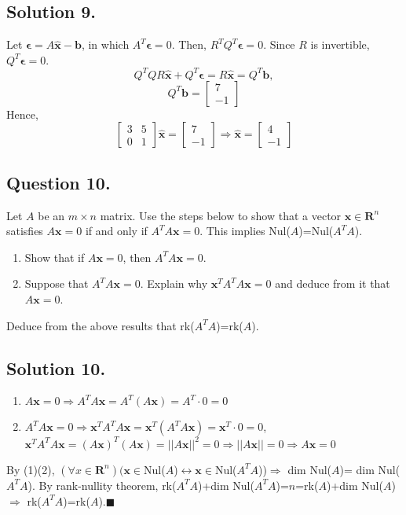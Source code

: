 \documentclass{article}
\begin{document}
\subsection*{Solution 9.}
Let $\mathbf{\epsilon}=A\mathbf{\hat{x}}-\mathbf{b}$,  in which $A^T\mathbf{\epsilon}=0$.\newline
Then, $R^TQ^T\mathbf{\epsilon}=0$. Since $R$ is invertible, $Q^T\mathbf{\epsilon}=0$.
\[Q^TQR\mathbf{\hat{x}}+Q^T\mathbf{\epsilon}=R\mathbf{\hat{x}}=Q^T\mathbf{b},\]
\[Q^T\mathbf{b}=\left[\begin{array}{r}7\\-1\end{array}\right]\]
Hence, 
\[\left[
\begin{array}{rr}
 3 &  5 \\
 0 &  1
\end{array}
\right]\mathbf{\hat{x}}=\left[\begin{array}{r}7\\-1\end{array}\right]\Rightarrow \mathbf{\hat{x}}=\left[\begin{array}{r}4\\-1\end{array}\right]\]
\subsection*{Question 10.}
Let $A$ be an $m\times n$ matrix. Use the steps below to show that a vector $\mathbf{x}\in\mathbf{R}^n$ satisfies $A\mathbf{x}=0$ if and only if $A^TA\mathbf{x}=0$. This implies Nul($A$)=Nul($A^TA$).
\begin{enumerate} [label=(\arabic*)]
    \item Show that if $A\mathbf{x}=0$, then $A^TA\mathbf{x}=0$.
    \item Suppose that $A^TA\mathbf{x}=0$. Explain why $\mathbf{x}^TA^TA\mathbf{x}=0$ and deduce from it that $A\mathbf{x}=0$.
\end{enumerate}
Deduce from the above results that rk($A^TA$)=rk($A$).
\subsection*{Solution 10.}
\begin{enumerate} [label=(\arabic*)]
    \item $A\mathbf{x}=0\Rightarrow A^TA\mathbf{x}=A^T(A\mathbf{x})=A^T\cdot 0=0$
    \item $A^TA\mathbf{x}=0\Rightarrow \mathbf{x}^TA^TA\mathbf{x}=\mathbf{x}^T(A^TA\mathbf{x})=\mathbf{x}^T\cdot 0=0$,\newline
    $\mathbf{x}^TA^TA\mathbf{x}=(A\mathbf{x})^T(A\mathbf{x})=||A\mathbf{x}||^2=0\Rightarrow||A\mathbf{x}||=0\Rightarrow A\mathbf{x}=0$
\end{enumerate}
By (1)(2), $(\forall x\in \mathbf{R}^n)(\mathbf{x}\in$Nul($A$)$\leftrightarrow\mathbf{x}\in$Nul($A^TA$))$\Rightarrow$ dim Nul($A$)= dim Nul($A^TA$).\newline
By rank-nullity theorem,\newline
rk($A^TA$)+dim Nul($A^TA$)=$n$=rk($A$)+dim Nul($A$)$\Rightarrow$ rk($A^TA$)=rk($A$).$\blacksquare$
\end{document}
